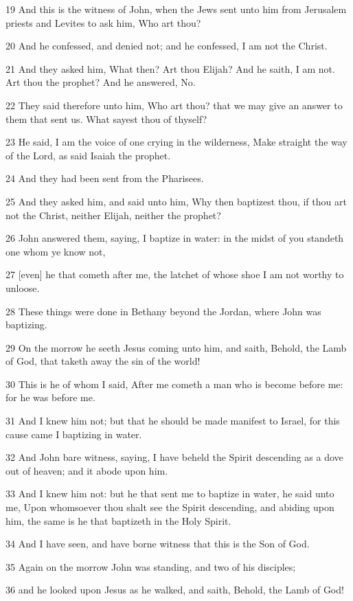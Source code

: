 \par 19 And this is the witness of John, when the Jews sent unto him from Jerusalem priests and Levites to ask him, Who art thou?
\par 20 And he confessed, and denied not; and he confessed, I am not the Christ.
\par 21 And they asked him, What then? Art thou Elijah? And he saith, I am not. Art thou the prophet? And he answered, No.
\par 22 They said therefore unto him, Who art thou? that we may give an answer to them that sent us. What sayest thou of thyself?
\par 23 He said, I am the voice of one crying in the wilderness, Make straight the way of the Lord, as said Isaiah the prophet.
\par 24 And they had been sent from the Pharisees.
\par 25 And they asked him, and said unto him, Why then baptizest thou, if thou art not the Christ, neither Elijah, neither the prophet?
\par 26 John answered them, saying, I baptize in water: in the midst of you standeth one whom ye know not,
\par 27 [even] he that cometh after me, the latchet of whose shoe I am not worthy to unloose.
\par 28 These things were done in Bethany beyond the Jordan, where John was baptizing.
\par 29 On the morrow he seeth Jesus coming unto him, and saith, Behold, the Lamb of God, that taketh away the sin of the world!
\par 30 This is he of whom I said, After me cometh a man who is become before me: for he was before me.
\par 31 And I knew him not; but that he should be made manifest to Israel, for this cause came I baptizing in water.
\par 32 And John bare witness, saying, I have beheld the Spirit descending as a dove out of heaven; and it abode upon him.
\par 33 And I knew him not: but he that sent me to baptize in water, he said unto me, Upon whomsoever thou shalt see the Spirit descending, and abiding upon him, the same is he that baptizeth in the Holy Spirit.
\par 34 And I have seen, and have borne witness that this is the Son of God.
\par 35 Again on the morrow John was standing, and two of his disciples;
\par 36 and he looked upon Jesus as he walked, and saith, Behold, the Lamb of God!
